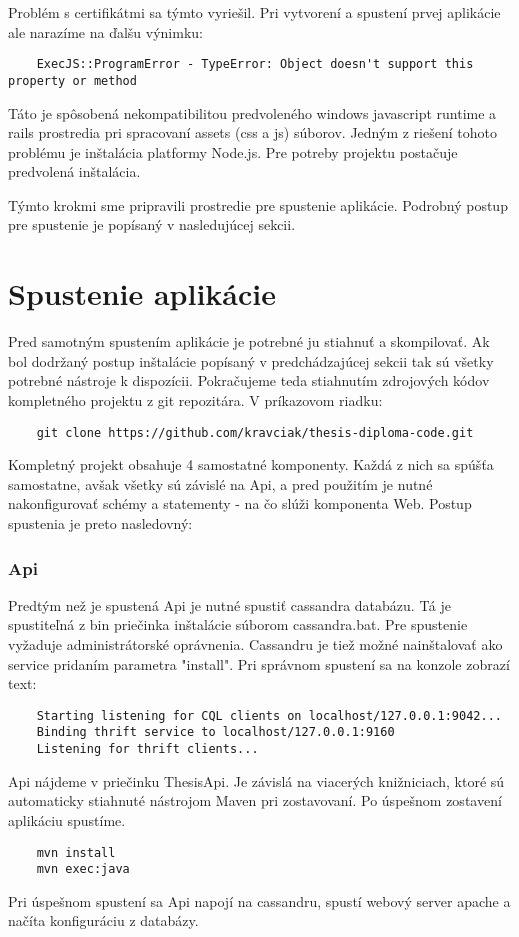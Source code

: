 	Problém s certifikátmi sa týmto vyriešil. Pri vytvorení a spustení prvej aplikácie ale narazíme na ďalšu výnimku:
	\begin{lstlisting}
	ExecJS::ProgramError - TypeError: Object doesn't support this property or method
	\end{lstlisting}
	Táto je spôsobená nekompatibilitou predvoleného windows javascript runtime a rails prostredia pri spracovaní assets (css a js) súborov. Jedným z riešení tohoto problému je inštalácia platformy Node.js. Pre potreby projektu postačuje predvolená inštalácia.
	
	Týmto krokmi sme pripravili prostredie pre spustenie aplikácie. Podrobný postup pre spustenie je popísaný v nasledujúcej sekcii.

\section{Spustenie aplikácie}
	Pred samotným spustením aplikácie je potrebné ju stiahnuť a skompilovať. Ak bol dodržaný postup inštalácie popísaný v predchádzajúcej sekcii tak sú všetky potrebné nástroje k dispozícii. Pokračujeme teda stiahnutím zdrojových kódov kompletného projektu z git repozitára. V príkazovom riadku:
	\begin{lstlisting}
	git clone https://github.com/kravciak/thesis-diploma-code.git
	\end{lstlisting}
	Kompletný projekt obsahuje 4 samostatné komponenty. Každá z nich sa spúšťa samostatne, avšak všetky sú závislé na Api, a pred použitím je nutné nakonfigurovať schémy a statementy - na čo slúži komponenta Web. Postup spustenia je preto nasledovný:
	
\subsubsection{Api}
	Predtým než je spustená Api je nutné spustiť cassandra databázu. Tá je spustiteľná z bin priečinka inštalácie súborom cassandra.bat. Pre spustenie vyžaduje administrátorské oprávnenia. Cassandru je tiež možné nainštalovať ako service pridaním parametra "install". Pri správnom spustení sa na konzole zobrazí text:
	\begin{lstlisting}
	Starting listening for CQL clients on localhost/127.0.0.1:9042...
	Binding thrift service to localhost/127.0.0.1:9160
	Listening for thrift clients...
	\end{lstlisting}
	
	Api nájdeme v priečinku ThesisApi. Je závislá na viacerých knižniciach, ktoré sú automaticky stiahnuté nástrojom Maven pri zostavovaní. Po úspešnom zostavení aplikáciu spustíme.
	\begin{lstlisting}
	mvn install
	mvn exec:java
	\end{lstlisting}
	Pri úspešnom spustení sa Api napojí na cassandru, spustí webový server apache a načíta konfiguráciu z databázy.
	
